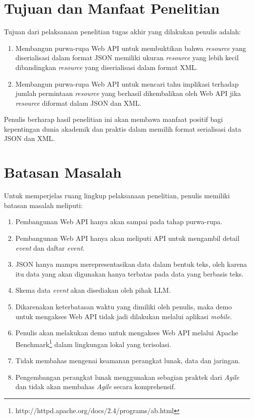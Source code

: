 \documentclass[a4paper, 12pt, oneside]{report}
\begin{document}
\section{Tujuan dan Manfaat Penelitian}
\onehalfspacing Tujuan dari pelaksanaan penelitian tugas akhir yang dilakukan penulis adalah:
\begin{enumerate}
  \item Membangun purwa-rupa Web API untuk membuktikan bahwa \textit{resource} yang diserialisasi dalam format JSON memiliki ukuran \textit{resource} yang lebih kecil dibandingkan \textit{resource} yang diserialisasi dalam format XML.
  \item Membangun purwa-rupa Web API untuk mencari tahu implikasi terhadap jumlah permintaan \textit{resource} yang berhasil dikembalikan oleh Web API jika \textit{resource} diformat dalam JSON dan XML.
\end{enumerate}

\onehalfspacing Penulis berharap hasil penelitian ini akan membawa manfaat positif bagi kepentingan dunia akademik dan praktis dalam memilih format serialisasi data JSON dan XML.

\section{Batasan Masalah}
\onehalfspacing Untuk memperjelas ruang lingkup pelaksanaan penelitian, penulis memiliki batasan masalah meliputi:
\onehalfspacing
\begin{enumerate}
  \item Pembangunan Web API hanya akan sampai pada tahap purwa-rupa.
  \item Pembangunan Web API hanya akan meliputi API untuk mengambil detail \textit{event} dan daftar \textit{event}.
  \item JSON hanya mampu merepresentasikan data dalam bentuk teks, oleh karena itu data yang akan digunakan hanya terbatas pada data yang berbasis teks.
  \item Skema data \textit{event} akan disediakan oleh pihak LLM.
  \item Dikarenakan keterbatasan waktu yang dimiliki oleh penulis, maka demo untuk mengakses Web API tidak jadi dilakukan melalui aplikasi \textit{mobile}.
  \item Penulis akan melakukan demo untuk mengakses Web API melalui Apache Benchmark\footnote{http://httpd.apache.org/docs/2.4/programs/ab.html} dalam lingkungan lokal yang terisolasi.
  \item Tidak membahas mengenai keamanan perangkat lunak, data dan jaringan.
  \item Pengembangan perangkat lunak menggunakan sebagian praktek dari \textit{Agile} dan tidak akan membahas \textit{Agile} secara komprehensif.
\end{enumerate}
\end{document}
